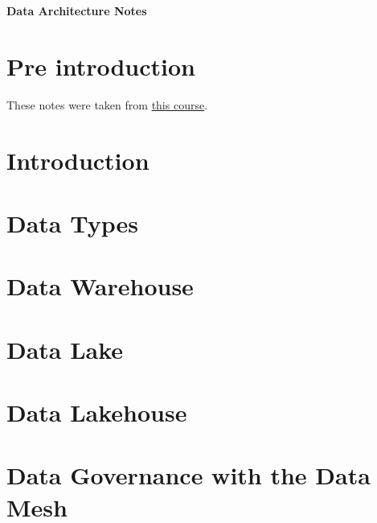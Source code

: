 \documentclass[a4paper, 11pt]{book}
\begin{document}
    \begin{titlepage}
        \centering
        \vspace*{2in}
        \Huge \textbf{Data Architecture Notes}
    \end{titlepage}

    \setcounter{section}{0}

    \newpage

    \tableofcontents
    \newpage

    \listoffigures
    \newpage


    \section{Pre introduction}
    These notes were taken from \href{https://www.udemy.com/course/data-architecture-for-data-scientists}{this course}.


    \section{Introduction}
    

    \section{Data Types}
    

    \section{Data Warehouse}
    

    \section{Data Lake}
    

    \section{Data Lakehouse}
    

    \section{Data Governance with the Data Mesh}
    
\end{document}
